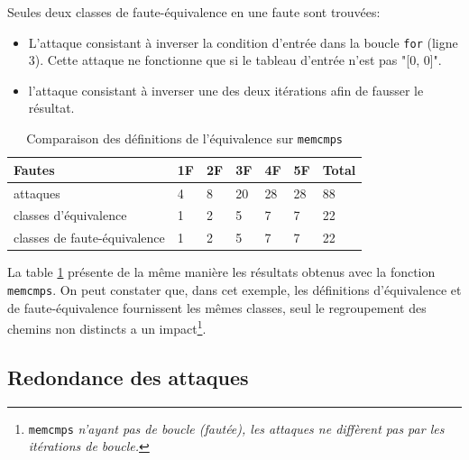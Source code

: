                 Seules deux classes de faute-équivalence en une faute sont trouvées:
                \begin{itemize}
                    \item L'attaque consistant à inverser la condition d'entrée dans la boucle \texttt{for} (ligne 3). Cette attaque ne fonctionne que si le tableau d'entrée n'est pas "[0, 0]".
                    \item l'attaque consistant à inverser une des deux itérations afin de fausser le résultat.
                \end{itemize}
            
                \begin{table}[ht]
                    \caption{Comparaison des définitions de l'équivalence sur \texttt{memcmps}}
                    \label{tbl:aeq-memcmps-results}
                    \small
                    \begin{center}
                        \begin{tabular}{l|llllll}
                        Fautes & 1F & 2F & 3F & 4F & 5F & Total \\
                        \hline 
                        attaques & 4 & 8 & 20 & 28 & 28 & 88\\
                        classes d'équivalence & 1 & 2 & 5  & 7 & 7 & 22\\
                        classes de faute-équivalence & 1 & 2 & 5  & 7 & 7 & 22\\
                        \end{tabular}
                    \end{center}
                \end{table} 

            
            La table \ref{tbl:aeq-memcmps-results} présente de la même manière les résultats obtenus avec la fonction \texttt{memcmps}.
            On peut constater que, dans cet exemple, les définitions d'équivalence et de faute-équivalence fournissent les mêmes classes, seul le regroupement des chemins non distincts a un impact\footnote{\texttt{memcmps} \textit{n'ayant pas de boucle (fautée), les attaques ne diffèrent pas par les itérations de boucle.}}. 
        
        \subsection{Redondance des attaques} 
        \label{sec:lazart-redundancy}
        
